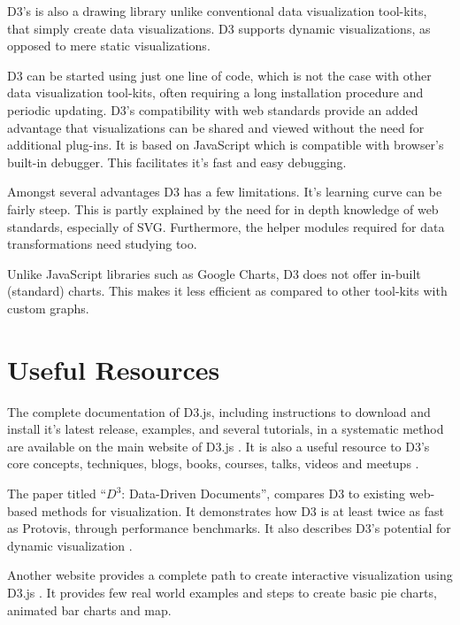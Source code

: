 \documentclass[9pt,twocolumn,twoside]{../../styles/osajnl}
\begin{document}
D3's is also a drawing library unlike conventional data visualization tool-kits, that simply create data visualizations. D3 supports dynamic visualizations, as opposed to mere static visualizations. 

D3 can be started using just one line of code, which is not the case with other data visualization tool-kits, often requiring a long installation procedure and periodic updating. D3's compatibility with web standards provide an added advantage that visualizations can be shared and viewed without the need for additional plug-ins. It is based on JavaScript which is compatible with browser’s built-in debugger. This facilitates it's fast and easy debugging.

Amongst several advantages D3 has a few limitations. It's  learning curve can be fairly steep. This is partly explained by the need for in depth knowledge of web standards, especially of SVG. Furthermore, the helper modules required for data transformations need studying too. 

Unlike JavaScript libraries such as Google Charts, D3 does not offer in-built (standard) charts. This makes it less efficient as compared to other tool-kits with custom graphs.

\section{Useful Resources}
The complete documentation of D3.js, including instructions to download and install it's latest release, examples, and several tutorials, in a systematic method are available on the main website of D3.js \cite{www-d3}. It is also a useful resource to D3's core concepts, techniques, blogs, books, courses, talks, videos and meetups \cite{www-tut}. 

The paper titled “$D^3$: Data-Driven Documents”, compares D3 to existing web-based methods for visualization. It demonstrates how D3 is at least twice as fast as Protovis, through performance benchmarks. It also describes D3’s potential for dynamic visualization \cite{paper-d3}.

Another website provides a complete path to create interactive visualization using D3.js \cite{www-av}. It provides few real world examples and steps to create basic pie charts, animated bar charts and map.
\end{document}
